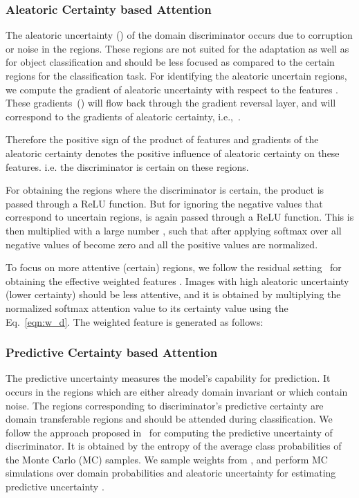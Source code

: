 \documentclass[10pt,twocolumn,letterpaper]{article}
\begin{document}
\vspace{-0.4cm}
\subsubsection{Aleatoric Certainty based Attention}
The aleatoric uncertainty () of the domain discriminator occurs due to corruption or noise in the regions. These regions are not suited for the adaptation as well as for object classification and should be less focused as compared to the certain regions for the classification task. For identifying the aleatoric uncertain regions, we compute the gradient of aleatoric uncertainty with respect to the features .
These gradients~() will flow back through the gradient reversal layer, and will correspond to the gradients of aleatoric certainty, i.e.,~.
\vspace{-0.4cm}

\vspace{-0.1cm}
Therefore the positive sign of the product of features and gradients of the aleatoric certainty denotes the positive influence of aleatoric certainty on these features. i.e. the discriminator is certain on these regions.
\vspace{-0.2em}

\vspace{-0.2em}
For obtaining the regions where the discriminator is certain, the product  is passed through a ReLU function. But for ignoring the negative values that correspond to uncertain regions,  is again passed through a ReLU function. This is then multiplied with a large number , such that after applying softmax over  all negative values of  become zero and all the positive values are normalized.  


\vspace{-0.6em}
To focus on more attentive (certain) regions, we follow the residual setting~\cite{long_NIPS2016} for obtaining the effective weighted features . Images with high aleatoric uncertainty (lower certainty) should be less attentive, and it is obtained by multiplying the normalized softmax attention value to its certainty value  using the Eq.~\ref{eqn:w_d}. The weighted feature  is generated as follows:

\subsubsection{Predictive Certainty based Attention}
The predictive uncertainty measures the model's capability for prediction. It occurs in the regions which are either already domain invariant or which contain noise. The regions corresponding to discriminator's predictive certainty are domain transferable regions and should be attended during classification. We follow the approach proposed in~\cite{kendall2017uncertainties} for computing the predictive uncertainty of discriminator. It is obtained by the entropy of the average class probabilities of the Monte Carlo (MC) samples.
We sample weights from , and perform MC simulations over domain probabilities  and aleatoric uncertainty  for estimating predictive uncertainty .
\end{document}
